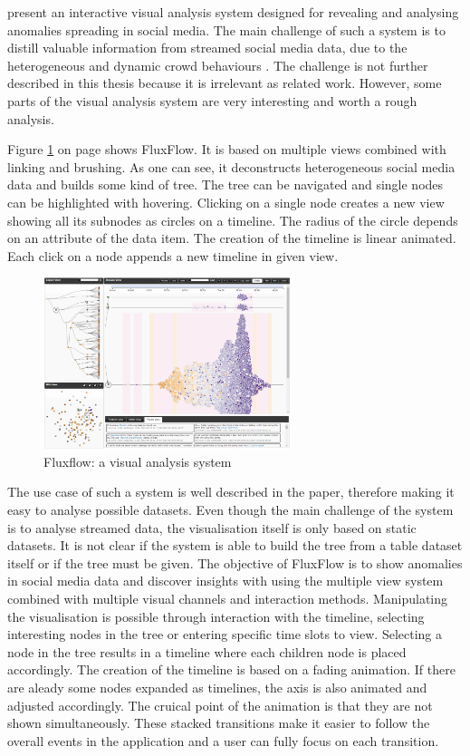 \citeauthor{Zhao2014} present an interactive visual analysis system designed for revealing and analysing anomalies spreading in social media. The main challenge of such a system is to distill valuable information from streamed social media data, due to the heterogeneous and dynamic crowd behaviours . The challenge is not further described in this thesis because it is irrelevant as related work. However, some parts of the visual analysis system are very interesting and worth a rough analysis.

Figure \ref{fig:fluxflow} on page \pageref{fig:fluxflow} shows FluxFlow. It is based on multiple views combined with linking and brushing. As one can see, it deconstructs heterogeneous social media data and builds some kind of tree. The tree can be navigated and single nodes can be highlighted with hovering. Clicking on a single node creates a new view showing all its subnodes as circles on a timeline. The radius of the circle depends on an attribute of the data item. The creation of the timeline is linear animated. Each click on a node appends a new timeline in given view.

\begin{figure}[!htb]
\centering
\includegraphics[height=5cm]{images/methods/related/fluxflow.png}
\caption[
    Fluxflow: a visual analysis system .
]{Fluxflow: a visual analysis system}
\label{fig:fluxflow}
\end{figure}

The use case of such a system is well described in the paper, therefore making it easy to analyse possible datasets. Even though the main challenge of the system is to analyse streamed data, the visualisation itself is only based on static datasets. It is not clear if the system is able to build the tree from a table dataset itself or if the tree must be given.
The objective of FluxFlow is to show anomalies in social media data and discover insights with using the multiple view system combined with multiple visual channels and interaction methods. Manipulating the visualisation is possible through interaction with the timeline, selecting interesting nodes in the tree or entering specific time slots to view. Selecting a node in the tree results in a timeline where each children node is placed accordingly. The creation of the timeline is based on a fading animation. If there are aleady some nodes expanded as timelines, the axis is also animated and adjusted accordingly. The cruical point of the animation is that they are not shown simultaneously. These stacked transitions make it easier to follow the overall events in the application and a user can fully focus on each transition.